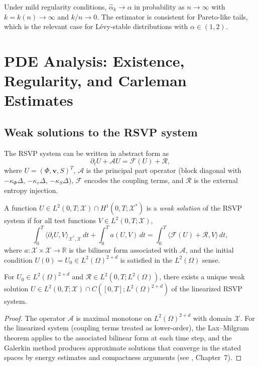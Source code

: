 \documentclass[12pt, oneside]{memoir}
\newcommand{\X}{\mathcal{X}}
\newcommand{\bv}{\mathbf{v}}
\begin{document}
Under mild regularity conditions, $\hat\alpha_k \to \alpha$ in probability as $n \to
\infty$ with $k = k(n) \to \infty$ and $k/n \to 0$.  The estimator is consistent for
Pareto-like tails, which is the relevant case for Lévy-stable distributions with
$\alpha \in (1,2)$.

\chapter{PDE Analysis: Existence, Regularity, and Carleman Estimates}
\label{app:pde}

\section{Weak solutions to the RSVP system}

The RSVP system  can be written in abstract form as
\begin{equation}
  \partial_t U + \mathcal{A} U = \mathcal{F}(U) + \mathcal{R},
\end{equation}
where $U = (\Phi, \bv, S)^T$, $\mathcal{A}$ is the principal part operator (block
diagonal with $-\kappa_\Phi \Delta$, $-\kappa_v \Delta$, $-\kappa_S \Delta$), $\mathcal{F}$
encodes the coupling terms, and $\mathcal{R}$ is the external entropy injection.

\begin{definition}
A function $U \in L^2(0,T; \X) \cap H^1(0,T; \X^*)$ is a \emph{weak solution} of the
RSVP system if for all test functions $V \in L^2(0,T; \X)$,
\begin{equation}
  \int_0^T \langle \partial_t U, V \rangle_{\X^*, \X}\, dt
  + \int_0^T a(U, V)\, dt
  = \int_0^T \langle \mathcal{F}(U) + \mathcal{R}, V \rangle\, dt,
\end{equation}
where $a: \X \times \X \to \mathbb{R}$ is the bilinear form associated with $\mathcal{A}$,
and the initial condition $U(0) = U_0 \in L^2(\Omega)^{2+d}$ is satisfied in the
$L^2(\Omega)$ sense.
\end{definition}

\begin{proposition}
\label{prop:weak-exist}
For $U_0 \in L^2(\Omega)^{2+d}$ and $\mathcal{R} \in L^2(0,T; L^2(\Omega))$, there
exists a unique weak solution $U \in L^2(0,T; \X) \cap C([0,T]; L^2(\Omega)^{2+d})$
of the linearized RSVP system.
\end{proposition}

\begin{proof}
The operator $\mathcal{A}$ is maximal monotone on $L^2(\Omega)^{2+d}$ with domain
$\X$.  For the linearized system (coupling terms treated as lower-order), the Lax--Milgram
theorem applies to the associated bilinear form at each time step, and the Galerkin method
produces approximate solutions that converge in the stated spaces by energy estimates and
compactness arguments (see \cite{evans2010}, Chapter~7).
\end{proof}
\end{document}
